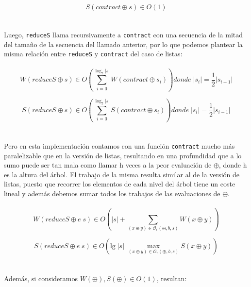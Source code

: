 \documentclass[a4paper,10pt]{article}
\begin{document}
		\begin{equation*}
			S \left( contract \oplus s \right) \in O \left( 1 \right)
		\end{equation*}
\\
\\	
		Luego, \texttt{reduceS} llama recursivamente a \texttt{contract} con una secuencia de la mitad del tamaño de la secuencia del llamado anterior, por lo que podemos plantear la misma relación entre \texttt{reduceS} y \texttt{contract} del caso de listas:
\\
\\	
	\begin{equation*}
		W \left( reduceS \oplus s \right) \in O \left(\sum_{i=0}^{\log_2 \vert s \vert} W \left( contract \oplus s_i \right) \right) donde \; \vert s_i\vert = \frac{1}{2} \vert s_{i-1} \vert
	\end{equation*}

	\begin{equation*}
		S \left( reduceS \oplus s \right) \in O \left(\sum_{i=0}^{\log_2 \vert s \vert} S \left( contract \oplus s_i \right) \right) donde \; \vert s_i\vert = \frac{1}{2} \vert s_{i-1} \vert
	\end{equation*}
\\
\\
	Pero en esta implementación contamos con una función \texttt{contract} mucho más paralelizable que en la versión de listas, resultando en una profundidad que a lo sumo puede ser tan mala como llamar h veces a la peor evaluación de $\oplus$, donde h es la altura del árbol. El trabajo de la misma resulta similar al de la versión de listas, puesto que recorrer los elementos de cada nivel del árbol tiene un coste lineal y además debemos sumar todos los trabajos de las evaluaciones de $\oplus$.
\\
\\
		\begin{equation*}
			W \left( reduceS \oplus e \; s \right) \in
			O \left( \vert s \vert + \sum_{(x \oplus y) \in \mathcal{O}_r(\oplus,b,s)} W \left( x \oplus y \right) \right)
		\end{equation*}

		\begin{equation*}
			S \left( reduceS \oplus e \; s \right) \in
			O \left( \text{lg} \; \vert s \vert \; \max_{(x \oplus y) \in \mathcal{O}_r(\oplus,b,s)} S \left( x \oplus y \right) \right)
		\end{equation*}
\\
\\
		Además, si consideramos $W(\oplus), S(\oplus) \in O(1)$, resultan:
	
\end{document}
